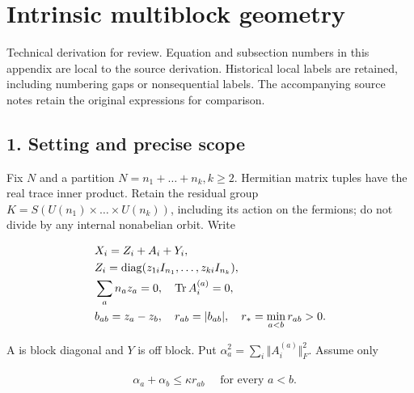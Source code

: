 \clearpage
\section{Intrinsic multiblock
geometry}\label{a-intrinsic-multiblock-geometry}

Technical derivation for review. Equation and subsection numbers in this
appendix are local to the source derivation. Historical local labels are
retained, including numbering gaps or nonsequential labels. The
accompanying source notes retain the original expressions for
comparison.

\subsection{1. Setting and precise
scope}\label{a-setting-and-precise-scope}

Fix \(N\) and a partition \(N=n_{1}+\ldots +n_{k}, k\ge 2\). Hermitian
matrix tuples have the real trace inner product. Retain the residual
group \(K=S(U(n_{1}) \times  \ldots  \times  U(n_{k}))\), including its
action on the fermions; do not divide by any internal nonabelian orbit.
Write

\begin{gather*}
\begin{aligned}
& X_{i}=Z_{i}+A_{i}+Y_{i}, \\
& Z_{i}=\operatorname{diag} (z_{1i} I_{n_{1}},\ldots ,z_{ki} I_{n_{k}}), \\
& \sum _{a} n_{a} z_{a}=0, \quad  \operatorname{Tr}  A_{i}^{(a)}=0, \\
& b_{ab}=z_{a}-z_{b}, \quad  r_{ab}=\vert b_{ab}\vert , \quad  r_{*}=\min _{a<b} r_{ab}>0.
\end{aligned}\notag
\end{gather*}

A is block diagonal and \(Y\) is off block. Put
\(\alpha _{a}^{2}=\sum _{i} \Vert A_{i}^{(a)}\Vert _{F}^{2}\). Assume
only

\begin{gather*}
\begin{aligned}
& \alpha _{a}+\alpha _{b} \le  \kappa  r_{ab} \quad  \text{ for every } a<b.
\end{aligned}\tag{1}
\end{gather*}

